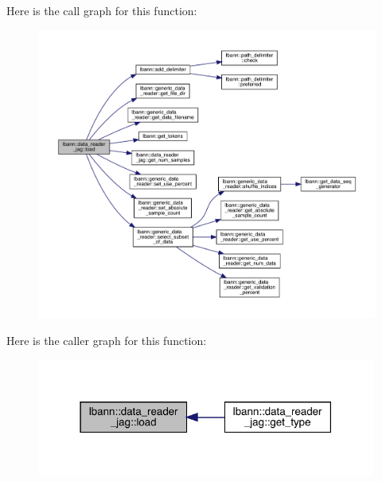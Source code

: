 Here is the call graph for this function\+:\nopagebreak
\begin{figure}[H]
\begin{center}
\leavevmode
\includegraphics[width=350pt]{classlbann_1_1data__reader__jag_a1a5c6cbbaba03f9826cbbd7657427351_cgraph}
\end{center}
\end{figure}
Here is the caller graph for this function\+:\nopagebreak
\begin{figure}[H]
\begin{center}
\leavevmode
\includegraphics[width=316pt]{classlbann_1_1data__reader__jag_a1a5c6cbbaba03f9826cbbd7657427351_icgraph}
\end{center}
\end{figure}
\mbox{\label{classlbann_1_1data__reader__jag_a300a937eb6022b5b2cd6d9405beb3d83}} 
